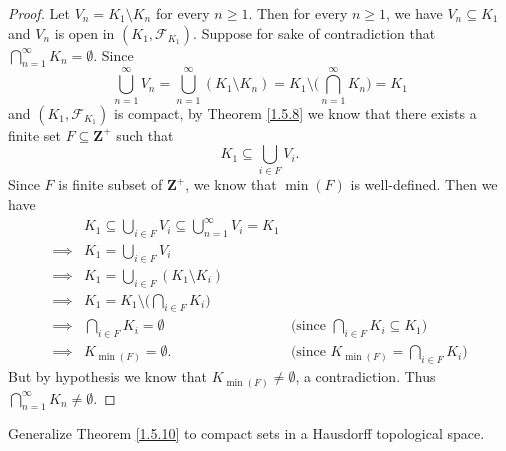 \begin{proof}
    Let \(V_n = K_1 \setminus K_n\) for every \(n \geq 1\).
    Then for every \(n \geq 1\), we have \(V_n \subseteq K_1\) and \(V_n\) is open in \((K_1, \mathcal{F}_{K_1})\).
    Suppose for sake of contradiction that \(\bigcap_{n = 1}^\infty K_n = \emptyset\).
    Since
    \[
        \bigcup_{n = 1}^\infty V_n = \bigcup_{n = 1}^\infty (K_1 \setminus K_n) = K_1 \setminus \bigg(\bigcap_{n = 1}^\infty K_n\bigg) = K_1
    \]
    and \((K_1, \mathcal{F}_{K_1})\) is compact, by Theorem \ref{1.5.8} we know that there exists a finite set \(F \subseteq \mathbf{Z}^+\) such that
    \[
        K_1 \subseteq \bigcup_{i \in F} V_i.
    \]
    Since \(F\) is finite subset of \(\mathbf{Z}^+\), we know that \(\min(F)\) is well-defined.
    Then we have
    \begin{align*}
                 & K_1 \subseteq \bigcup_{i \in F} V_i \subseteq \bigcup_{n = 1}^\infty V_i = K_1                                                          \\
        \implies & K_1 = \bigcup_{i \in F} V_i                                                                                                             \\
        \implies & K_1 = \bigcup_{i \in F} (K_1 \setminus K_i)                                                                                             \\
        \implies & K_1 = K_1 \setminus \bigg(\bigcap_{i \in F} K_i\bigg)                                                                                   \\
        \implies & \bigcap_{i \in F} K_i = \emptyset                                              & \text{(since \(\bigcap_{i \in F} K_i \subseteq K_1)\)} \\
        \implies & K_{\min(F)} = \emptyset.                                                       & \text{(since \(K_{\min(F)} = \bigcap_{i \in F} K_i)\)}
    \end{align*}
    But by hypothesis we know that \(K_{\min(F)} \neq \emptyset\), a contradiction.
    Thus \(\bigcap_{n = 1}^\infty K_n \neq \emptyset\).
\end{proof}

\begin{exercise}\label{ex 2.5.14}
    Generalize Theorem \ref{1.5.10} to compact sets in a Hausdorff topological space.
\end{exercise}

